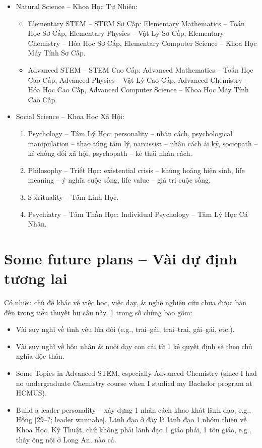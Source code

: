 \documentclass[12pt,oneside]{book}
\begin{document}
\begin{itemize}
	\item Natural Science -- Khoa Học Tự Nhiên:
	\begin{itemize}
		\item Elementary STEM -- STEM Sơ Cấp: Elementary Mathematics -- Toán Học Sơ Cấp, Elementary Physics -- Vật Lý Sơ Cấp, Elementary Chemistry -- Hóa Học Sơ Cấp, Elementary Computer Science -- Khoa Học Máy Tính Sơ Cấp.
		\item Advanced STEM -- STEM Cao Cấp: Advanced Mathematics -- Toán Học Cao Cấp, Advanced Physics -- Vật Lý Cao Cấp, Advanced Chemistry -- Hóa Học Cao Cấp, Advanced Computer Science -- Khoa Học Máy Tính Cao Cấp.
	\end{itemize}
	\item Social Science -- Khoa Học Xã Hội:
	\begin{enumerate}
		\item Psychology -- Tâm Lý Học: personality -- nhân cách, psychological manipulation -- thao túng tâm lý, narcissist -- nhân cách ái kỷ, sociopath -- kẻ chống đối xã hội, psychopath -- kẻ thái nhân cách.
		\item Philosophy -- Triết Học: existential crisis -- khủng hoảng hiện sinh, life meaning -- ý nghĩa cuộc sống, life value -- giá trị cuộc sống.
		\item Spirituality -- Tâm Linh Học.
		\item Psychiatry -- Tâm Thần Học: Individual Psychology -- Tâm Lý Học Cá Nhân.
	\end{enumerate}
\end{itemize}

\section{Some future plans -- Vài dự định tương lai}
Có nhiều chủ đề khác về việc học, việc dạy, \& nghề nghiên cứu chưa được bàn đến trong tiểu thuyết hư cấu này. 1 trong số chúng bao gồm:
\begin{itemize}
	\item Vài suy nghĩ về tình yêu lứa đôi (e.g., trai--gái, trai--trai, gái--gái, etc.).
	\item Vài suy nghĩ về hôn nhân \& nuôi dạy con cái từ 1 kẻ quyết định sẽ theo chủ nghĩa độc thân.
	\item Some Topics in Advanced STEM, especially Advanced Chemistry (since I had no undergraduate Chemistry course when I studied my Bachelor program at HCMUS).
	\item Build a leader personality -- xây dựng 1 nhân cách khao khát lãnh đạo, e.g., {\sf Hồng [29--?; leader wannabe]}. Lãnh đạo ở đây là lãnh đạo 1 nhóm thiên về Khoa Học, Kỹ Thuật, chứ không phải lãnh đạo 1 giáo phái, 1 tôn giáo, e.g., thầy ông nội ở Long An, nào cả.
\end{itemize}
\end{document}
